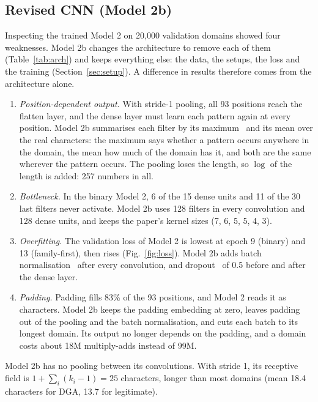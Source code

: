 \documentclass[11pt]{article}
\begin{document}
\subsection{Revised CNN (Model 2b)}\label{sec:cnn2}
Inspecting the trained Model 2 on 20{,}000 validation domains showed four
weaknesses. Model 2b changes the architecture to remove each of them
(Table~\ref{tab:arch}) and keeps everything else: the data, the setups, the loss
and the training (Section~\ref{sec:setup}). A difference in results therefore
comes from the architecture alone.
\begin{enumerate}
  \item \emph{Position-dependent output.} With stride-1 pooling, all 93 positions
  reach the flatten layer, and the dense layer must learn each pattern again at
  every position. Model 2b summarises each filter by its maximum~\cite{kim2014cnn}
  and its mean over the real characters: the maximum says whether a pattern occurs
  anywhere in the domain, the mean how much of the domain has it, and both are the
  same wherever the pattern occurs. The pooling loses the length, so $\log$ of the
  length is added: 257 numbers in all.
  \item \emph{Bottleneck.} In the binary Model 2, 6 of the 15 dense units and 11
  of the 30 last filters never activate. Model 2b uses 128 filters in every
  convolution and 128 dense units, and keeps the paper's kernel sizes
  (7, 6, 5, 5, 4, 3).
  \item \emph{Overfitting.} The validation loss of Model 2 is lowest at epoch 9
  (binary) and 13 (family-first), then rises (Fig.~\ref{fig:loss}). Model 2b adds
  batch normalisation~\cite{ioffe2015batchnorm} after every convolution, and
  dropout~\cite{srivastava2014dropout} of 0.5 before and after the dense layer.
  \item \emph{Padding.} Padding fills 83\% of the 93 positions, and Model 2 reads
  it as characters. Model 2b keeps the padding embedding at zero, leaves padding
  out of the pooling and the batch normalisation, and cuts each batch to its
  longest domain. Its output no longer depends on the padding, and a domain costs
  about 18M multiply-adds instead of 99M.
\end{enumerate}
Model 2b has no pooling between its convolutions. With stride 1, its receptive
field is $1 + \sum_i (k_i - 1) = 25$ characters, longer than most domains (mean
18.4 characters for DGA, 13.7 for legitimate).
\end{document}

